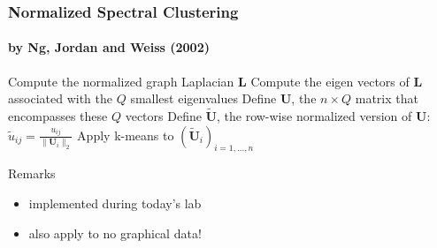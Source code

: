\documentclass{beamer}\usepackage[]{graphicx}\usepackage[]{color}
\begin{document}
\begin{frame}
  \frametitle{Normalized Spectral Clustering}
  \framesubtitle{by Ng, Jordan and Weiss (2002)}

\begin{algorithm}[H]
  \BlankLine\BlankLine
  \DontPrintSemicolon
  
  Compute the normalized graph Laplacian $\mathbf{L}$\;
  Compute the eigen vectors of $\mathbf{L}$ associated with the $Q$ \alert{smallest eigenvalues}\;
  Define $\mathbf{U}$,  the $n\times Q$ matrix  that encompasses these $Q$ vectors \;
  Define $\tilde{\mathbf{U}}$, the row-wise normalized version of $\mathbf{U}$: $ \tilde{u}_{ij} = \frac{u_{ij}}{\| \mathbf{U}_i\|_2}$\;
  Apply k-means to $(\tilde{\mathbf{U}}_i)_{i=1,\dots,n}$

  \BlankLine\BlankLine

\end{algorithm}

  \vfill

  \begin{block}{Remarks}
    \begin{itemize}
      \item implemented during today's lab
      \item also apply to no graphical data!
    \end{itemize}
  \end{block}
  
\end{frame}

% 
%   
% 
% 
% 
\end{document}
